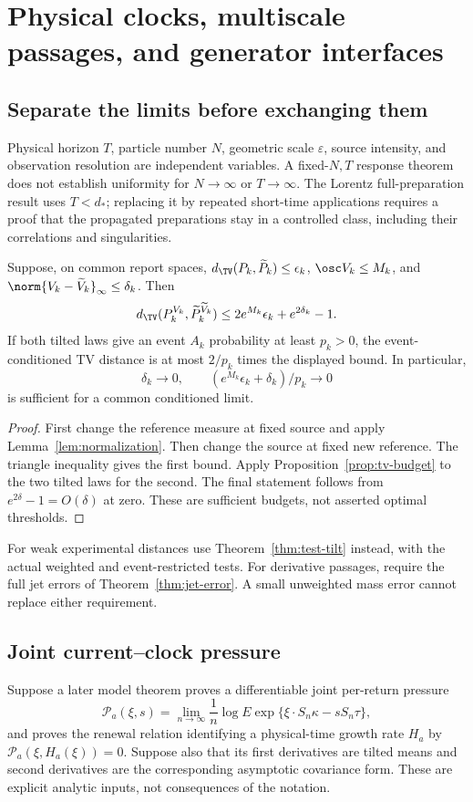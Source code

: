 \section{Physical clocks, multiscale passages, and generator interfaces}\label{sec:limits}
\subsection{Separate the limits before exchanging them}
Physical horizon $T$, particle number $N$, geometric scale $\varepsilon$, source intensity, and observation resolution are independent variables. A fixed-$N,T$ response theorem does not establish uniformity for $N\to\infty$ or $T\to\infty$. The Lorentz full-preparation result uses $T<d_*$; replacing it by repeated short-time applications requires a proof that the propagated preparations stay in a controlled class, including their correlations and singularities.

\begin{theorem}\label{thm:diagonal}
Suppose, on common report spaces, $d_{\TV}(P_k,\widetilde P_k)\le\epsilon_k$,
$\osc V_k\le M_k$, and $\norm{V_k-\widetilde V_k}_\infty\le\delta_k$. Then
\[
 d_{\TV}(P_k^{V_k},\widetilde P_k^{\widetilde V_k})
 \le2e^{M_k}\epsilon_k+e^{2\delta_k}-1.
\]
If both tilted laws give an event $A_k$ probability at least $p_k>0$, the event-conditioned TV distance is at most $2/p_k$ times the displayed bound. In particular,
\[
 \delta_k\to0,\qquad (e^{M_k}\epsilon_k+\delta_k)/p_k\to0
\]
is sufficient for a common conditioned limit.
\end{theorem}
\begin{proof}
First change the reference measure at fixed source and apply Lemma~\ref{lem:normalization}. Then change the source at fixed new reference. The triangle inequality gives the first bound. Apply Proposition~\ref{prop:tv-budget} to the two tilted laws for the second. The final statement follows from $e^{2\delta}-1=O(\delta)$ at zero. These are sufficient budgets, not asserted optimal thresholds.
\end{proof}

For weak experimental distances use Theorem~\ref{thm:test-tilt} instead, with the actual weighted and event-restricted tests. For derivative passages, require the full jet errors of Theorem~\ref{thm:jet-error}. A small unweighted mass error cannot replace either requirement.

\subsection{Joint current--clock pressure}
Suppose a later model theorem proves a differentiable joint per-return pressure
\[
 \mathcal P_a(\xi,s)
 =\lim_{n\to\infty}\frac1n\log E\exp\{\xi\cdot S_n\kappa-sS_n\tau\},
\]
and proves the renewal relation identifying a physical-time growth rate $H_a$ by
$\mathcal P_a(\xi,H_a(\xi))=0$. Suppose also that its first derivatives are tilted means and second derivatives are the corresponding asymptotic covariance form. These are explicit analytic inputs, not consequences of the notation.

